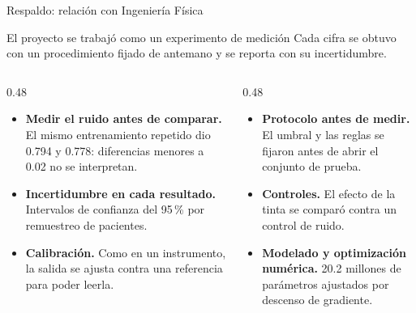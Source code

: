 \documentclass[aspectratio=169,10pt]{beamer}
\begin{document}
\begin{frame}{Respaldo: relación con Ingeniería Física}
  \begin{block}{El proyecto se trabajó como un experimento de medición}
    Cada cifra se obtuvo con un procedimiento fijado de antemano y se reporta con su incertidumbre.
  \end{block}
  \vspace{0.4em}
  \begin{columns}[T]
    \begin{column}{0.48\textwidth}
      \begin{itemize}
        \item \textbf{Medir el ruido antes de comparar.} El mismo entrenamiento repetido dio 0.794 y 0.778: diferencias menores a 0.02 no se interpretan.
        \item \textbf{Incertidumbre en cada resultado.} Intervalos de confianza del 95\,\% por remuestreo de pacientes.
        \item \textbf{Calibración.} Como en un instrumento, la salida se ajusta contra una referencia para poder leerla.
      \end{itemize}
    \end{column}
    \begin{column}{0.48\textwidth}
      \begin{itemize}
        \item \textbf{Protocolo antes de medir.} El umbral y las reglas se fijaron antes de abrir el conjunto de prueba.
        \item \textbf{Controles.} El efecto de la tinta se comparó contra un control de ruido.
        \item \textbf{Modelado y optimización numérica.} 20.2 millones de parámetros ajustados por descenso de gradiente.
      \end{itemize}
    \end{column}
  \end{columns}
\end{frame}
\end{document}
